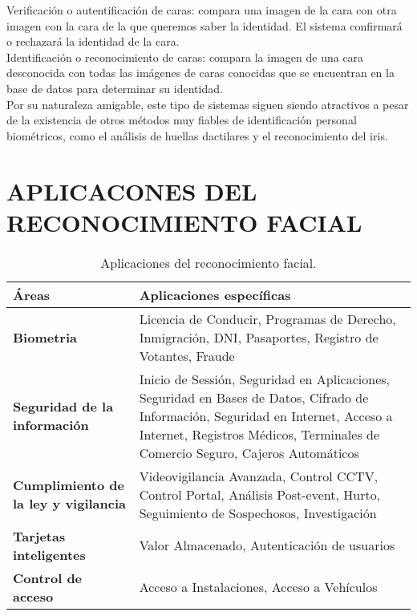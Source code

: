 \documentclass[a4paper,11pt]{article}
\begin{document}
Verificación o autentificación de caras: compara una imagen de la cara con otra imagen con la cara de la que queremos saber la identidad. El sistema confirmará o rechazará la identidad de la cara.\\
Identificación o reconocimiento de caras: compara la imagen de una cara desconocida con todas las imágenes de caras conocidas que se encuentran en la base de datos para determinar su identidad.\\

Por su naturaleza amigable, este tipo de sistemas siguen siendo atractivos a pesar de la existencia de otros métodos muy fiables de identificación personal biométricos, como el análisis de huellas dactilares y el reconocimiento del iris. \\

\section{APLICACONES DEL RECONOCIMIENTO FACIAL}
 \begin{table}[htbp]
	
	
	
	\begin{tabular}{|p{5cm}|p{10cm}|}
		\hline
		\textbf{Áreas} & Aplicaciones específicas \\
		\hline \hline
		\textbf{	Biometria} & Licencia de Conducir, Programas de Derecho, Inmigración, DNI, Pasaportes, Registro de Votantes, Fraude \\ \hline
		\textbf{	Seguridad de la información} & Inicio de Sessión, Seguridad en Aplicaciones, Seguridad en Bases de Datos, Cifrado de Información, Seguridad en Internet, Acceso a Internet, Registros Médicos, Terminales de Comercio Seguro, Cajeros Automáticos \\ \hline
		\textbf{	Cumplimiento de la ley y vigilancia} & Videovigilancia Avanzada, Control CCTV, Control Portal, Análisis Post-event, Hurto, Seguimiento de Sospechosos, Investigación \\ \hline
		
		\textbf{ Tarjetas inteligentes} & Valor Almacenado, Autenticación de usuarios	\\ \hline
		\textbf{Control de acceso}	 & Acceso a Instalaciones, Acceso a Vehículos	\\ \hline
	\end{tabular}
	\caption{ Aplicaciones del reconocimiento facial. }
	\label{tabla:Aplicaciones del reconocimiento facial.}
\end{table}
\end{document}
